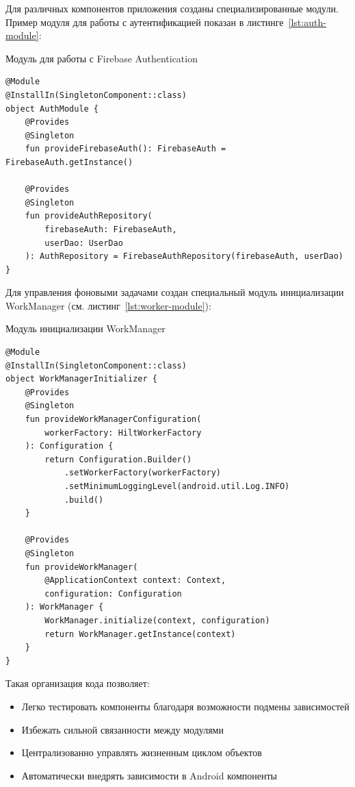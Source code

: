 \documentclass[14pt, russian]{scrartcl}
\begin{document}
Для различных компонентов приложения созданы специализированные модули. Пример модуля для работы с аутентификацией показан в листинге~\ref{lst:auth-module}:

\begin{listing}[!htb]
\caption{Модуль для работы с Firebase Authentication}
\label{lst:auth-module}
\begin{verbatim}
@Module
@InstallIn(SingletonComponent::class)
object AuthModule {
    @Provides
    @Singleton
    fun provideFirebaseAuth(): FirebaseAuth = FirebaseAuth.getInstance()

    @Provides
    @Singleton
    fun provideAuthRepository(
        firebaseAuth: FirebaseAuth,
        userDao: UserDao
    ): AuthRepository = FirebaseAuthRepository(firebaseAuth, userDao)
}
\end{verbatim}
\end{listing}

Для управления фоновыми задачами создан специальный модуль инициализации WorkManager (см. листинг~\ref{lst:worker-module}):

\begin{listing}[!htb]
\caption{Модуль инициализации WorkManager}
\label{lst:worker-module}
\begin{verbatim}
@Module
@InstallIn(SingletonComponent::class)
object WorkManagerInitializer {
    @Provides
    @Singleton
    fun provideWorkManagerConfiguration(
        workerFactory: HiltWorkerFactory
    ): Configuration {
        return Configuration.Builder()
            .setWorkerFactory(workerFactory)
            .setMinimumLoggingLevel(android.util.Log.INFO)
            .build()
    }

    @Provides
    @Singleton
    fun provideWorkManager(
        @ApplicationContext context: Context,
        configuration: Configuration
    ): WorkManager {
        WorkManager.initialize(context, configuration)
        return WorkManager.getInstance(context)
    }
}
\end{verbatim}
\end{listing}

Такая организация кода позволяет:
\begin{itemize}
\item Легко тестировать компоненты благодаря возможности подмены зависимостей
\item Избежать сильной связанности между модулями
\item Централизованно управлять жизненным циклом объектов
\item Автоматически внедрять зависимости в Android компоненты
\end{itemize}
\end{document}
